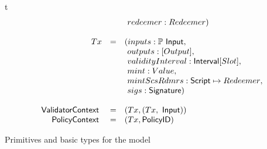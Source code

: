 \begin{ruledfigure}{t}
\begin{displaymath}
\begin{array}{rll}
                & &\ \redeemer: \Redeemer)\\
    \\
    \eutxotx &=&(\inputs: \powerset{\Input},\\
               & &\ \outputs: [\Output],\\
               & &\ \fun{validityInterval}: \Interval{\Tick},\\
               & &\ \mint: \Value,\\
               & &\ \mintScsRdmrs: \Script \mapsto \Redeemer,\\
               & &\ \sigs: \Signature)\\
    \\
    \s{\vlctx}\s{ } &=& (\Tx, (\Tx,~\Input)) \\
    \s{\mpsctx}\s{ } &=& (\Tx, \Policy)
    \end{array}
  \end{displaymath}
  \caption{Primitives and basic types for the \EUTXOma{} model}
  \label{fig:eutxo-types}
\end{ruledfigure}
%

